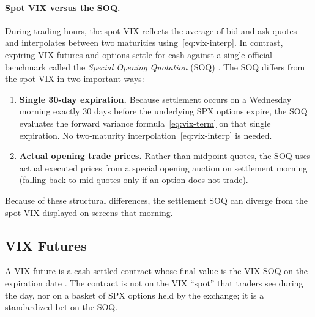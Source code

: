 \paragraph{Spot VIX versus the SOQ.} During trading hours, the spot VIX reflects the average of bid and ask quotes and interpolates between two maturities using~\eqref{eq:vix-interp}. In contrast, expiring VIX futures and options settle for cash against a single official benchmark called the \emph{Special Opening Quotation} (SOQ) \cite{cboewp}. The SOQ differs from the spot VIX in two important ways:
\begin{enumerate}
  \item \textbf{Single 30-day expiration.} Because settlement occurs on a Wednesday morning exactly 30 days before the underlying SPX options expire, the SOQ evaluates the forward variance formula~\eqref{eq:vix-term} on that single expiration. No two-maturity interpolation~\eqref{eq:vix-interp} is needed.
  \item \textbf{Actual opening trade prices.} Rather than midpoint quotes, the SOQ uses actual executed prices from a special opening auction on settlement morning (falling back to mid-quotes only if an option does not trade).
\end{enumerate}
Because of these structural differences, the settlement SOQ can diverge from the spot VIX displayed on screens that morning.

\subsection{VIX Futures}
\label{sec:vix-futures}

A VIX future is a cash-settled contract whose final value is the VIX SOQ on the expiration date \cite{cboevxfut}. The contract is not on the VIX ``spot'' that traders see during the day, nor on a basket of SPX options held by the exchange; it is a standardized bet on the SOQ.

